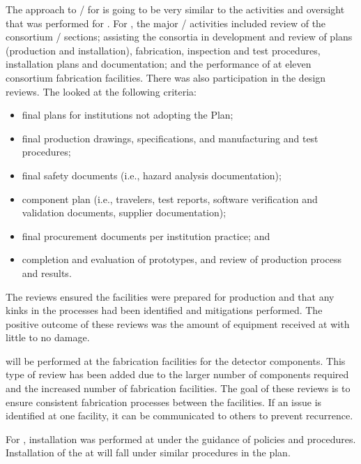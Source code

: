 The approach to / for  is going to be
very similar to the activities and oversight that was performed for
.  For , the major
/ activities included review of the consortium
 / sections; assisting the consortia in
development and review of  plans (production and
installation), fabrication, inspection and test procedures,
installation plans and documentation; and the performance of
 at eleven consortium fabrication facilities.  There was
also  participation in the  design reviews.
The  looked at the following criteria:
\begin{itemize}
  \item final  plans for institutions not adopting the
      Plan;
  \item final production drawings, specifications, and manufacturing
    and test procedures;
  \item final safety documents (i.e., hazard analysis documentation);
  \item component  plan (i.e., travelers, test reports,
    software verification and validation documents, supplier
    documentation);
  \item final procurement documents per institution practice; and
  \item completion and evaluation of prototypes, and review of production
    process and  results.
\end{itemize}
The reviews ensured the facilities
were prepared for production and that any kinks in the processes had been
identified and mitigations performed. %
The positive outcome of
these reviews was the amount of equipment received at  with little
to no damage.

 will be performed at the fabrication facilities for the
 detector components. This type of review has been added due to the
larger number of components required and the increased number of
fabrication facilities. The goal of these reviews is to ensure
consistent fabrication processes between the facilities. If an issue
is identified at one facility, it can be communicated to %
others to prevent recurrence. %

For , installation was performed at  under the
guidance of  policies and procedures. Installation of the
  at  will fall under similar procedures in the
  plan.

